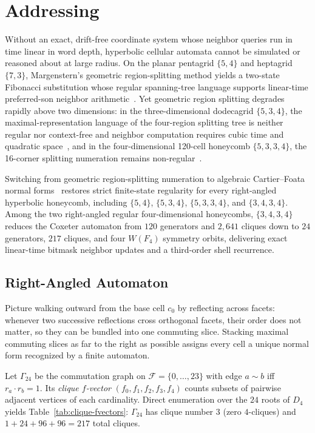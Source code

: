 \section{Addressing}
\label{sec:addressing}

Without an exact, drift-free coordinate system whose neighbor queries run in time linear in word depth, hyperbolic cellular automata cannot be simulated or reasoned about at large radius. On the planar pentagrid $\{5,4\}$ and heptagrid $\{7,3\}$, Margenstern's geometric region-splitting method yields a two-state Fibonacci substitution whose regular spanning-tree language supports linear-time preferred-son neighbor arithmetic~\cite{margenstern2007vol1,margenstern2016coords,margenstern2019fib1}. Yet geometric region splitting degrades rapidly above two dimensions: in the three-dimensional dodecagrid $\{5,3,4\}$, the maximal-representation language of the four-region splitting tree is neither regular nor context-free and neighbor computation requires cubic time and quadratic space~\cite{margenstern2003skordev,margenstern2007vol1}, and in the four-dimensional 120-cell honeycomb $\{5,3,3,4\}$, the 16-corner splitting numeration remains non-regular~\cite{margenstern2004fourd,margenstern2007vol1}.

Switching from geometric region-splitting numeration to algebraic Cartier--Foata normal forms~\cite{cartier1969} restores strict finite-state regularity for every right-angled hyperbolic honeycomb, including $\{5,4\}$, $\{5,3,4\}$, $\{5,3,3,4\}$, and $\{3,4,3,4\}$. Among the two right-angled regular four-dimensional honeycombs, $\{3,4,3,4\}$ reduces the Coxeter automaton from $120$ generators and $2{,}641$ cliques down to $24$ generators, $217$ cliques, and four $W(F_4)$ symmetry orbits, delivering exact linear-time bitmask neighbor updates and a third-order shell recurrence.

\subsection{Right-Angled Automaton}
\label{subsec:racg-automaton}

Picture walking outward from the base cell $c_0$ by reflecting across facets: whenever two successive reflections cross orthogonal facets, their order does not matter, so they can be bundled into one commuting slice. Stacking maximal commuting slices as far to the right as possible assigns every cell a unique normal form recognized by a finite automaton.

Let $\Gamma_{24}$ be the commutation graph on $\mathcal{F} = \{0,\dots,23\}$ with edge $a \sim b$ iff $r_a \cdot r_b = 1$. Its \emph{clique $f$-vector} $(f_0, f_1, f_2, f_3, f_4)$ counts subsets of pairwise adjacent vertices of each cardinality. Direct enumeration over the $24$ roots of $D_4$ yields Table~\ref{tab:clique-fvectors}: $\Gamma_{24}$ has clique number $3$ (zero $4$-cliques) and $1 + 24 + 96 + 96 = 217$ total cliques.

